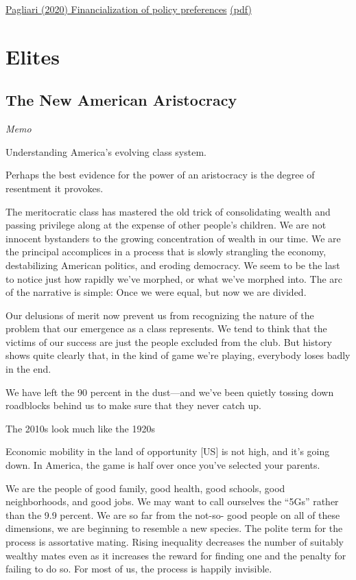 \documentclass[
]{book}
\begin{document}
\href{https://academic.oup.com/ser/article/18/3/655/5058009}{Pagliari (2020) Financialization of policy preferences}
\href{pdf/Pagliari_2020_Financialization_of_Policy_Preferences.pdf}{(pdf)}

\hypertarget{elites}{%
\section{Elites}\label{elites}}

\hypertarget{the-new-american-aristocracy}{%
\subsection{The New American Aristocracy}\label{the-new-american-aristocracy}}

\emph{Memo}

Understanding America's evolving class system.

Perhaps the best evidence for the power of an aristocracy is
the degree of resentment it provokes.

The meritocratic class has mastered the old trick of consolidating
wealth and passing privilege along at the expense of other people's
children. We are not innocent bystanders to the growing
concentration of wealth in our time. We are the principal
accomplices in a process that is slowly strangling the economy,
destabilizing American politics, and eroding democracy.
We seem to be the last to notice just
how rapidly we've morphed, or what we've morphed into.
The arc of the narrative is simple: Once we
were equal, but now we are divided.

Our delusions of merit now prevent us from recognizing the nature of the
problem that our emergence as a class represents. We tend to think
that the victims of our success are just the people excluded from the
club. But history shows quite clearly that, in the kind of game we're
playing, everybody loses badly in the end.

We have left the 90 percent
in the dust---and we've been quietly tossing down roadblocks behind
us to make sure that they never catch up.

The 2010s look much like the 1920s

Economic mobility in the land of
opportunity {[}US{]} is not high, and it's going down.
In America, the game is half over
once you've selected your parents.

We are the people of good family, good health, good schools, good
neighborhoods, and good jobs. We may want to call ourselves the
``5Gs'' rather than the 9.9 percent.
We are so far from the not-so-
good people on all of these dimensions, we are beginning to resemble
a new species.
The polite term for the process is assortative mating.
Rising inequality decreases the
number of suitably wealthy mates even as it increases the reward for
finding one and the penalty for failing to do so.
For most of us, the process is happily invisible.
\end{document}
